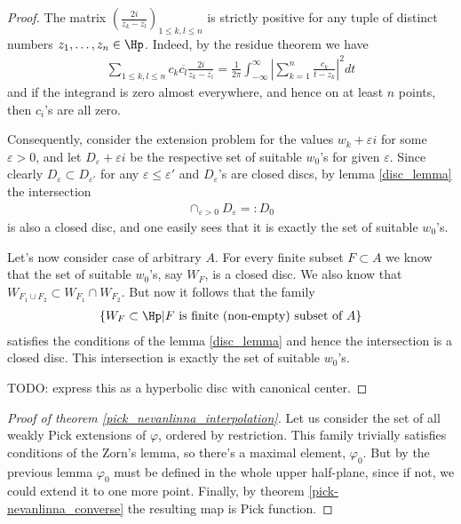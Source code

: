 \begin{proof}
	The matrix $\left(\frac{2 i}{z_{k} - \overline{z_{l}}}\right)_{1 \leq k,l \leq n}$ is strictly positive for any tuple of distinct numbers $z_{1}, \ldots, z_{n} \in \Hp$. Indeed, by the residue theorem we have
	\begin{align*}
		\sum_{1 \leq k,l \leq n} c_{k} \overline{c_{l}} \frac{2 i}{z_{k} - \overline{z_{l}}} = \frac{1}{2 \pi}\int_{-\infty}^{\infty} \left|\sum_{k = 1}^{n} \frac{c_{k}}{t - z_{k}}\right|^{2} d t
	\end{align*}
	and if the integrand is zero almost everywhere, and hence on at least $n$ points, then $c_{i}$'s are all zero.

	Consequently, consider the extension problem for the values $w_{k} + \varepsilon i$ for some $\varepsilon > 0$, and let $D_{\varepsilon} + \varepsilon i$ be the respective set of suitable $w_{0}$'s for given $\varepsilon$. Since clearly $D_{\varepsilon} \subset D_{\varepsilon'}$ for any $\varepsilon \leq \varepsilon'$ and $D_{\varepsilon}$'s are closed discs, by lemma \ref{disc_lemma} the intersection
	\begin{align*}
		\cap_{\varepsilon > 0} D_{\varepsilon} =: D_{0}
	\end{align*}
	is also a closed disc, and one easily sees that it is exactly the set of suitable $w_{0}$'s.

	Let's now consider case of arbitrary $A$. For every finite subset $F \subset A$ we know that the set of suitable $w_{0}$'s, say $W_{F}$, is a closed disc. We also know that $W_{F_{1} \cup F_{2}} \subset W_{F_{1}} \cap W_{F_{2}}$. But now it follows that the family
	\begin{align*}
		\{W_{F} \subset \Hp | \text{$F$ is finite (non-empty) subset of $A$} \}
	\end{align*}
	satisfies the conditions of the lemma \ref{disc_lemma} and hence the intersection is a closed disc. This intersection is exactly the set of suitable $w_{0}$'s.

	TODO: express this as a hyperbolic disc with canonical center.
\end{proof}

\begin{proof}[Proof of theorem \ref{pick_nevanlinna_interpolation}]
Let us consider the set of all weakly Pick extensions of $\varphi$, ordered by restriction. This family trivially satisfies conditions of the Zorn's lemma, so there's a maximal element, $\varphi_{0}$. But by the previous lemma $\varphi_{0}$ must be defined in the whole upper half-plane, since if not, we could extend it to one more point. Finally, by theorem \ref{pick-nevanlinna_converse} the resulting map is Pick function.
\end{proof}

